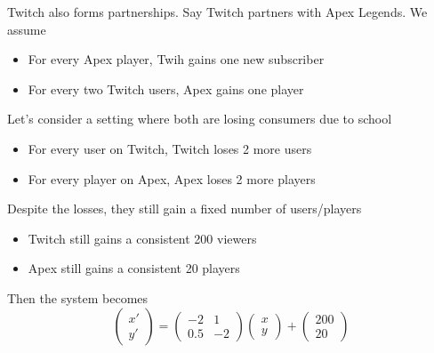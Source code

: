 \documentclass[12pt]{article}
\begin{document}
Twitch also forms partnerships. Say Twitch partners with Apex Legends. We assume
\begin{itemize}
	\item For every Apex player, Twih gains one new subscriber
	\item For every two Twitch users, Apex gains one player
\end{itemize}

Let's consider a setting where both are losing consumers due to school
\begin{itemize}
	\item For every user on Twitch, Twitch loses 2 more users
	\item For every player on Apex, Apex loses 2 more players
\end{itemize}

Despite the losses, they still gain a fixed number of users/players
\begin{itemize}
	\item Twitch still gains a consistent 200 viewers
	\item Apex still gains a consistent 20 players
\end{itemize}
Then the system becomes
$$\begin{pmatrix} x' \\ y' \end{pmatrix} = \begin{pmatrix} -2 & 1 \\ 0.5 & -2 \end{pmatrix} \begin{pmatrix} x \\ y \end{pmatrix} + \begin{pmatrix} 200 \\ 20 \end{pmatrix}$$
\end{document}
